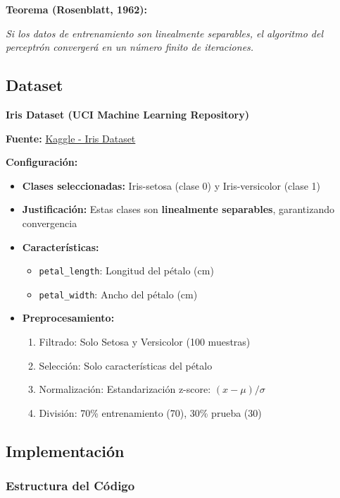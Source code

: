\documentclass[12pt]{src/formato_utem}
\begin{document}
\textbf{Teorema (Rosenblatt, 1962):}

\textit{Si los datos de entrenamiento son linealmente separables, el algoritmo del perceptrón convergerá en un número finito de iteraciones.}

\subsection{Dataset}

\textbf{Iris Dataset (UCI Machine Learning Repository)}

\textbf{Fuente:} \href{https://www.kaggle.com/datasets/uciml/iris/data}{Kaggle - Iris Dataset}

\textbf{Configuración:}
\begin{itemize}
    \item \textbf{Clases seleccionadas:} Iris-setosa (clase 0) y Iris-versicolor (clase 1)
    \item \textbf{Justificación:} Estas clases son \textbf{linealmente separables}, garantizando convergencia
    \item \textbf{Características:} 
    \begin{itemize}
        \item \texttt{petal\_length}: Longitud del pétalo (cm)
        \item \texttt{petal\_width}: Ancho del pétalo (cm)
    \end{itemize}
    \item \textbf{Preprocesamiento:}
    \begin{enumerate}
        \item Filtrado: Solo Setosa y Versicolor (100 muestras)
        \item Selección: Solo características del pétalo
        \item Normalización: Estandarización z-score: $(x - \mu) / \sigma$
        \item División: 70\% entrenamiento (70), 30\% prueba (30)
    \end{enumerate}
\end{itemize}

\subsection{Implementación}

\subsubsection{Estructura del Código}
\end{document}
